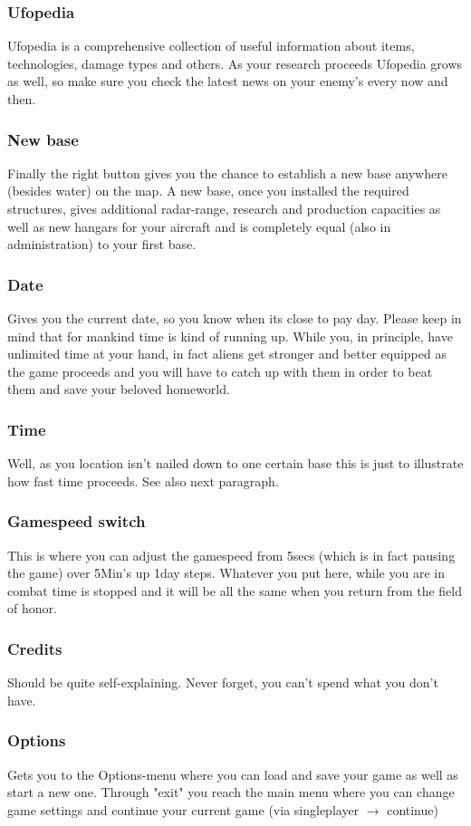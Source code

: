 \subsubsection{Ufopedia}
Ufopedia is a comprehensive collection of useful information about items, technologies, damage types and others. As your research proceeds Ufopedia grows as well, so make sure you check the latest news on your enemy's every now and then.
\subsubsection{New base}
Finally the right button gives you the chance to establish a new base anywhere (besides water) on the map. A new base, once you installed the required structures, gives additional radar-range, research and production capacities as well as new hangars for your aircraft and is completely equal (also in administration) to your first base.
\subsubsection{Date}
Gives you the current date, so you know when its close to pay day. Please keep in mind that for mankind time is kind of running up. While you, in principle, have unlimited time at your hand, in fact aliens get stronger and better equipped as the game proceeds and you will have to catch up with them in order to beat them and save your beloved homeworld.
\subsubsection{Time}
Well, as you location isn't nailed down to one certain base this is just to illustrate how fast time proceeds. See also next paragraph.
\subsubsection{Gamespeed switch}
This is where you can adjust the gamespeed from 5secs (which is in fact pausing the game) over 5Min's up 1day steps. Whatever you put here, while you are in combat time is stopped and it will be all the same when you return from the field of honor.
\subsubsection{Credits}
Should be quite self-explaining. Never forget, you can't spend what you don't have.
\subsubsection{Options}
Gets you to the Options-menu where you can load and save your game as well as start a new one.
Through "exit" you reach the main menu where you can change game settings and continue your current game (via singleplayer $\rightarrow$ continue)

